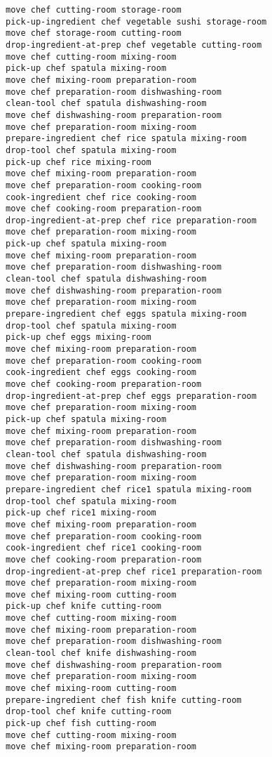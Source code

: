 \documentclass[a4paper,12pt]{article}
\begin{document}
\begin{lstlisting}[language=PDDL, caption=Plan for Problem 3]
move chef cutting-room storage-room 
pick-up-ingredient chef vegetable sushi storage-room 
move chef storage-room cutting-room 
drop-ingredient-at-prep chef vegetable cutting-room 
move chef cutting-room mixing-room 
pick-up chef spatula mixing-room 
move chef mixing-room preparation-room 
move chef preparation-room dishwashing-room 
clean-tool chef spatula dishwashing-room 
move chef dishwashing-room preparation-room 
move chef preparation-room mixing-room 
prepare-ingredient chef rice spatula mixing-room 
drop-tool chef spatula mixing-room 
pick-up chef rice mixing-room 
move chef mixing-room preparation-room 
move chef preparation-room cooking-room 
cook-ingredient chef rice cooking-room 
move chef cooking-room preparation-room 
drop-ingredient-at-prep chef rice preparation-room 
move chef preparation-room mixing-room 
pick-up chef spatula mixing-room 
move chef mixing-room preparation-room 
move chef preparation-room dishwashing-room 
clean-tool chef spatula dishwashing-room 
move chef dishwashing-room preparation-room 
move chef preparation-room mixing-room 
prepare-ingredient chef eggs spatula mixing-room 
drop-tool chef spatula mixing-room 
pick-up chef eggs mixing-room 
move chef mixing-room preparation-room 
move chef preparation-room cooking-room 
cook-ingredient chef eggs cooking-room 
move chef cooking-room preparation-room 
drop-ingredient-at-prep chef eggs preparation-room 
move chef preparation-room mixing-room 
pick-up chef spatula mixing-room 
move chef mixing-room preparation-room 
move chef preparation-room dishwashing-room 
clean-tool chef spatula dishwashing-room 
move chef dishwashing-room preparation-room 
move chef preparation-room mixing-room 
prepare-ingredient chef rice1 spatula mixing-room 
drop-tool chef spatula mixing-room 
pick-up chef rice1 mixing-room 
move chef mixing-room preparation-room 
move chef preparation-room cooking-room 
cook-ingredient chef rice1 cooking-room 
move chef cooking-room preparation-room 
drop-ingredient-at-prep chef rice1 preparation-room 
move chef preparation-room mixing-room 
move chef mixing-room cutting-room 
pick-up chef knife cutting-room 
move chef cutting-room mixing-room 
move chef mixing-room preparation-room 
move chef preparation-room dishwashing-room 
clean-tool chef knife dishwashing-room 
move chef dishwashing-room preparation-room 
move chef preparation-room mixing-room 
move chef mixing-room cutting-room 
prepare-ingredient chef fish knife cutting-room 
drop-tool chef knife cutting-room 
pick-up chef fish cutting-room 
move chef cutting-room mixing-room 
move chef mixing-room preparation-room 

\end{lstlisting}
\end{document}
